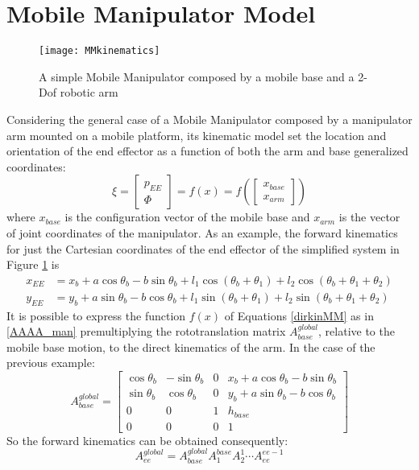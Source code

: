 \section{Mobile Manipulator Model}
\begin{figure}
\centering
\texttt{[image: MMkinematics]}
\caption{A simple Mobile Manipulator composed by a mobile base and a 2-Dof robotic arm}
\label{fig:MMkinematics}
\end{figure}
Considering the general case of a Mobile Manipulator composed by a manipulator arm mounted on a mobile platform, its kinematic model set the location and orientation of the end effector as a function of both the arm and base generalized coordinates:
\begin{equation}\label{dirkinMM}
	\xi=\left[\begin{matrix}p_{EE}\\\Phi\end{matrix}\right]=f(x)=f\left(\left[\begin{matrix}x_{base}\\x_{arm} \end{matrix}\right]\right)
\end{equation}
where $x_{base}$ is the configuration vector of the mobile base and $x_{arm}$ is the vector of joint coordinates of the manipulator.
As an example, the forward kinematics for just the Cartesian coordinates of the end effector of the simplified system in Figure \ref{fig:MMkinematics} is
\begin{equation*}
\begin{split}
	x_{EE}&=x_b+a\cos\theta_b-b\sin\theta_b+l_1\cos\left(\theta_b+\theta_1\right)+l_2\cos\left(\theta_b+\theta_1+\theta_2\right)\\
	y_{EE}&=y_b+a\sin\theta_b-b\cos\theta_b+l_1\sin\left(\theta_b+\theta_1\right)+l_2\sin\left(\theta_b+\theta_1+\theta_2\right)
\end{split}
\end{equation*}
It is possible to express the function $f(x)$ of Equations \eqref{dirkinMM} as in \eqref{AAAA_man} premultiplying the rototranslation matrix $A_{base}^{global}$, relative to the mobile base motion, to the direct kinematics of the arm. In the case of the previous example:
\begin{equation}
	A_{base}^{global}=\left[\begin{matrix}
		\cos\theta_b&-\sin\theta_b&0&x_b+a\cos\theta_b-b\sin\theta_b\\
		\sin\theta_b&\cos\theta_b&0&y_b+a\sin\theta_b-b\cos\theta_b\\
		0&0&1&h_{base}\\
		0&0&0&1
	\end{matrix}\right]
\end{equation}
So the forward kinematics can be obtained consequently:
\begin{equation}\label{AAAA}
A_{ee}^{global}=A_{base}^{global}A_1^{base}A_2^1\cdots A_{ee}^{ee-1}
\end{equation}
